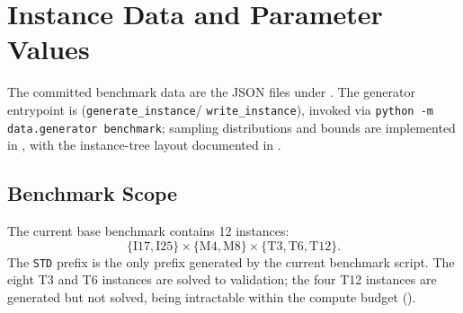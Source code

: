 
\section{Instance Data and Parameter Values}
\label{app:data}

The committed benchmark data are the JSON files under
. The generator entrypoint is
 (\texttt{generate\_instance}/
\texttt{write\_instance}), invoked via
\texttt{python -m data.generator benchmark}; sampling distributions
and bounds are implemented in ,
with the instance-tree layout documented in .

\subsection{Benchmark Scope}
\label{app:data:scope}

The current base benchmark contains 12 instances:
\[
  \{\mathrm{I17},\mathrm{I25}\}
  \times
  \{\mathrm{M4},\mathrm{M8}\}
  \times
  \{\mathrm{T3},\mathrm{T6},\mathrm{T12}\}.
\]
The \texttt{STD} prefix is the only prefix generated by the current
benchmark script. The eight T3 and T6 instances are solved to validation; the
four T12 instances are generated but not solved, being intractable within the
compute budget ().

